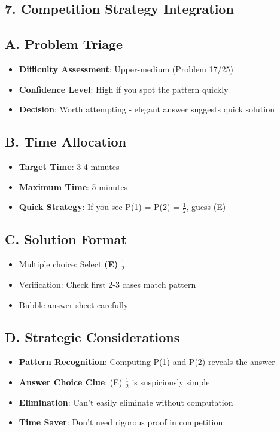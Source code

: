 \documentclass[11pt]{article}
\begin{document}
\begin{competitionbox}
\section*{7. Competition Strategy Integration}

\subsection*{A. Problem Triage}
\begin{itemize}[leftmargin=*]
    \item \textbf{Difficulty Assessment}: Upper-medium (Problem 17/25)
    \item \textbf{Confidence Level}: High if you spot the pattern quickly
    \item \textbf{Decision}: Worth attempting - elegant answer suggests quick solution
\end{itemize}

\subsection*{B. Time Allocation}
\begin{itemize}[leftmargin=*]
    \item \textbf{Target Time}: 3-4 minutes
    \item \textbf{Maximum Time}: 5 minutes
    \item \textbf{Quick Strategy}: If you see P(1) = P(2) = $\frac{1}{2}$, guess (E)
\end{itemize}

\subsection*{C. Solution Format}
\begin{itemize}[leftmargin=*]
    \item Multiple choice: Select \textbf{(E)} $\frac{1}{2}$
    \item Verification: Check first 2-3 cases match pattern
    \item Bubble answer sheet carefully
\end{itemize}

\subsection*{D. Strategic Considerations}
\begin{itemize}[leftmargin=*]
    \item \textbf{Pattern Recognition}: Computing P(1) and P(2) reveals the answer
    \item \textbf{Answer Choice Clue}: (E) $\frac{1}{2}$ is suspiciously simple
    \item \textbf{Elimination}: Can't easily eliminate without computation
    \item \textbf{Time Saver}: Don't need rigorous proof in competition
\end{itemize}
\end{competitionbox}
\end{document}
